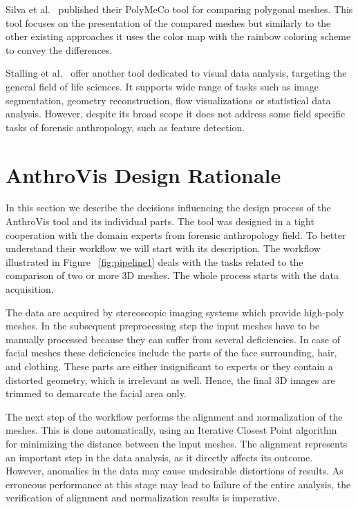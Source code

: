 \documentclass[final,5p,times]{elsarticle}
\begin{document}
Silva et al.~\cite{Silva2005} published their PolyMeCo tool for comparing polygonal meshes. 
This tool focuses on the presentation of the compared meshes but similarly to the other existing approaches it uses the color map with the rainbow coloring scheme to convey the differences.

Stalling et al.~\cite{stalling200538} offer another tool dedicated to visual data analysis, targeting the general field of life sciences. 
It supports wide range of tasks such as image segmentation, geometry reconstruction, flow visualizations or statistical data analysis.
However, despite its broad scope it does not address some field specific tasks of forensic anthropology, such as feature detection.

\section{AnthroVis Design Rationale} \label{overview}
In this section we describe the decisions influencing the design process of the AnthroVis tool and its individual parts.
The tool was designed in a tight cooperation with the domain experts from forensic anthropology field.
To better understand their workflow we will start with its description.
The workflow illustrated in Figure ~\ref{fig:pipeline1} deals with the tasks related to the comparison of two or more 3D meshes.
The whole process starts with the data acquisition.

The data are acquired by stereoscopic imaging systems which provide high-poly meshes. 
In the subsequent preprocessing step the input meshes have to be manually processed because they can suffer from several deficiencies. 
In case of facial meshes these deficiencies include the parts of the face surrounding, hair, and clothing.
These parts are either insignificant to experts or they contain a distorted geometry, which is irrelevant as well. 
Hence, the final 3D images are trimmed to demarcate the facial area only.

The next step of the workflow performs the alignment and normalization of the meshes. 
This is done automatically, using an Iterative Closest Point algorithm~\cite{besl1992method} for minimizing the distance between the input meshes.
The alignment represents an important step in the data analysis, as it directly affects its outcome.
However, anomalies in the data may cause undesirable distortions of results. 
As erroneous performance at this stage may lead to failure of the entire analysis, the verification of alignment and normalization results is imperative.
\end{document}
